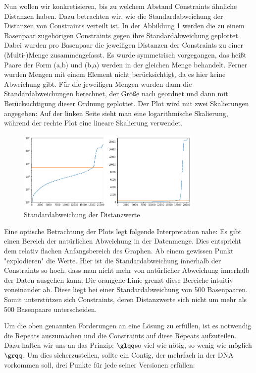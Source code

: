 Nun wollen wir konkretisieren, bis zu welchem Abstand Constraints ähnliche Distanzen haben. Dazu betrachten wir, wie die Standardabweichung der Distanzen von Constraints verteilt ist.
In der Abbildung \ref{std} werden die zu einem Basenpaar zugehörigen Constraints gegen ihre Standardabweichung geplottet. 
Dabei wurden pro Basenpaar die jeweiligen Distanzen der Constraints zu einer (Multi-)Menge zusammengefasst. Es wurde symmetrisch vorgegangen, das heißt Paare der Form (a,b) und (b,a) werden in der gleichen Menge behandelt. Ferner wurden Mengen mit einem Element nicht berücksichtigt, da es hier keine Abweichung gibt. Für die jeweiligen Mengen wurden dann die Standardabweichungen berechnet, der Größe nach geordnet und dann mit Berücksichtigung dieser Ordnung geplottet.
Der Plot wird mit zwei Skalierungen angegeben: Auf der linken Seite sieht man eine logarithmische Skalierung, während der rechte Plot eine lineare Skalierung verwendet.

\begin{figure}
	\begin{center}
		\includegraphics[width=0.8\textwidth]{bilder/std}
	\end{center}
	\caption{Standardabweichung der Distanzwerte}
	\label{std}
\end{figure}




Eine optische Betrachtung der Plots legt folgende Interpretation nahe: 
Es gibt einen Bereich der natürlichen Abweichung in der Datenmenge. Dies entspricht dem relativ flachen Anfangsbereich des Graphen. Ab einem gewissen Punkt "explodieren" die Werte. Hier ist die Standardabweichung innerhalb der Constraints so hoch, dass man nicht mehr von natürlicher Abweichung innerhalb der Daten ausgehen kann. Die orangene Linie grenzt diese Bereiche intuitiv voneinander ab. 
Diese liegt bei einer Standardabweichung von 500 Basenpaaren. 
Somit unterstützen sich Constraints, deren Distanzwerte sich nicht um mehr als 500 Basenpaare unterscheiden.

Um die oben genannten Forderungen an eine Lösung zu erfüllen, ist es notwendig die Repeats auszumachen und die Constraints auf diese Repeats aufzuteilen. Dazu halten wir uns an das Prinzip: $\glqq$so viel wie nötig, so wenig wie möglich$\grqq$.
Um dies sicherzustellen, sollte ein Contig, der mehrfach in der DNA vorkommen soll, drei Punkte für jede seiner Versionen erfüllen:

